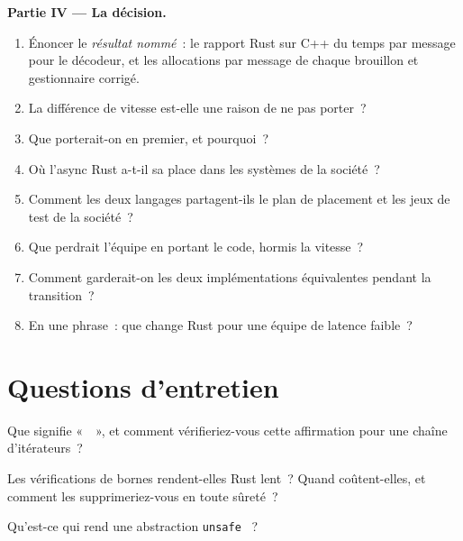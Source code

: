 \begin{problem}
\medskip\noindent\textbf{Partie IV --- La décision.}
\begin{enumerate}[resume]
\item Énoncer le \emph{résultat nommé}~: le rapport Rust sur C++ du temps par message pour le décodeur, et les allocations par
message de chaque brouillon et gestionnaire corrigé.
\item La différence de vitesse est-elle une raison de ne pas porter~?
\item Que porterait-on en premier, et pourquoi~?
\item Où l'async Rust a-t-il sa place dans les systèmes de la société~?
\item Comment les deux langages partagent-ils le plan de placement et les jeux de test de la société~?
\item Que perdrait l'équipe en portant le code, hormis la vitesse~?
\item Comment garderait-on les deux implémentations équivalentes pendant la transition~?
\item En une phrase~: que change Rust pour une équipe de latence faible~?
\end{enumerate}
\end{problem}

\section{Questions d'entretien}

\begin{interviewq}\label{iq:ll:rust-for-low-latency:1}
Que signifie «~~», et comment vérifieriez-vous cette affirmation pour une chaîne d'itérateurs~?
\end{interviewq}

\begin{interviewq}\label{iq:ll:rust-for-low-latency:2}
Les vérifications de bornes rendent-elles Rust lent~? Quand coûtent-elles, et comment les supprimeriez-vous en toute sûreté~?
\end{interviewq}

\begin{interviewq}\label{iq:ll:rust-for-low-latency:3}
Qu'est-ce qui rend une abstraction \texttt{unsafe} ~?
\end{interviewq}

